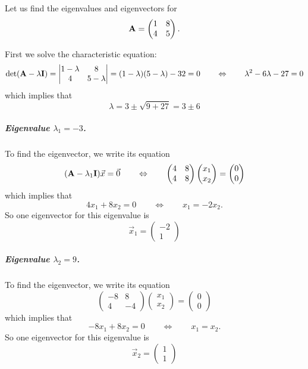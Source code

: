 \begin{example}
Let us find the eigenvalues and eigenvectors for
$$
{\bf A} = \begin{pmatrix} 1 & 8 \\ 4 & 5 \end{pmatrix}.
$$

First we solve the characteristic equation:
$$
\det({\bf A} - \lambda {\bf I}) 
	= \begin{vmatrix}
		1 - \lambda & 8 \\	
		4 & 5 - \lambda
	\end{vmatrix}
	= (1-\lambda)(5-\lambda) - 32 = 0
\qquad \Leftrightarrow \qquad
	\lambda^2 - 6 \lambda -27=0
$$
which implies that
$$
\lambda = 3 \pm \sqrt{9 + 27} = 3 \pm 6
$$


\subparagraph{Eigenvalue $\lambda_1 = -3$. } To find the eigenvector, we write its equation
$$
({\bf A} - \lambda_1 {\bf I} ) \vec{x} = \vec{0}
\qquad \Leftrightarrow \qquad
\begin{pmatrix}
	4 & 8 \\
	4 & 8
\end{pmatrix}
\begin{pmatrix}
x_1 \\ x_2 
\end{pmatrix}
	= \begin{pmatrix}
	0 \\ 0
	\end{pmatrix}
$$
which implies that
$$
4x_1 +8x_2 = 0
\qquad \Leftrightarrow \qquad
x_1 = -2 x_2.
$$
So one eigenvector for this eigenvalue is
$$
\vec{x}_1 = \begin{pmatrix}
	-2 \\ 1
	\end{pmatrix}
$$


\subparagraph{Eigenvalue $\lambda_2 = 9$. } To find the eigenvector, we write its equation
$$
\begin{pmatrix}
	-8  & 8 \\
	4 & -4
\end{pmatrix}
\begin{pmatrix}
x_1 \\ x_2 
\end{pmatrix}
	= \begin{pmatrix}
	0 \\ 0
	\end{pmatrix}
$$
which implies that
$$
-8x_1 +8x_2 = 0
\qquad \Leftrightarrow \qquad
x_1 = x_2.
$$
So one eigenvector for this eigenvalue is
$$
\vec{x}_2 = \begin{pmatrix}
	1 \\ 1
	\end{pmatrix}
$$
\end{example}





